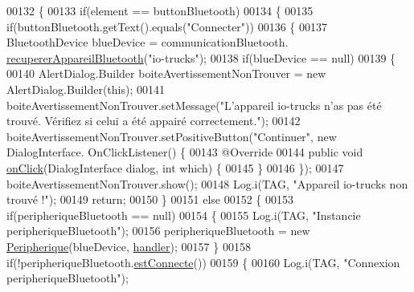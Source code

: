 \begin{DoxyCode}
00132     \{
00133         \textcolor{keywordflow}{if}(element == buttonBluetooth)
00134         \{
00135             \textcolor{keywordflow}{if}(buttonBluetooth.getText().equals(\textcolor{stringliteral}{"Connecter"}))
00136             \{
00137                 BluetoothDevice blueDevice = communicationBluetooth.
      \hyperlink{classcom_1_1lasalle_1_1io__trucks_1_1_communication_a84ae8043b94d6f156a30f6f90dbbba4e}{recupererAppareilBluetooth}(\textcolor{stringliteral}{"io-trucks"});
00138                 \textcolor{keywordflow}{if}(blueDevice == null)
00139                 \{
00140                     AlertDialog.Builder boiteAvertissementNonTrouver = \textcolor{keyword}{new} AlertDialog.Builder(\textcolor{keyword}{this});
00141                     boiteAvertissementNonTrouver.setMessage(\textcolor{stringliteral}{"L'appareil io-trucks n'as pas été trouvé.
       Vérifiez si celui a été appairé correctement."});
00142                     boiteAvertissementNonTrouver.setPositiveButton(\textcolor{stringliteral}{"Continuer"}, \textcolor{keyword}{new} DialogInterface.
      OnClickListener() \{
00143                         @Override
00144                         \textcolor{keyword}{public} \textcolor{keywordtype}{void} \hyperlink{classcom_1_1lasalle_1_1io__trucks_1_1_main_activity_a154e0d879d71bfbe95bc2d566517589d}{onClick}(DialogInterface dialog, \textcolor{keywordtype}{int} which) \{
00145                         \}
00146                     \});
00147                     boiteAvertissementNonTrouver.show();
00148                     Log.i(TAG, \textcolor{stringliteral}{"Appareil io-trucks non trouvé !"});
00149                     \textcolor{keywordflow}{return};
00150                 \}
00151                 \textcolor{keywordflow}{else}
00152                 \{
00153                     \textcolor{keywordflow}{if}(peripheriqueBluetooth == null)
00154                     \{
00155                         Log.i(TAG, \textcolor{stringliteral}{"Instancie peripheriqueBluetooth"});
00156                         peripheriqueBluetooth = \textcolor{keyword}{new} \hyperlink{classcom_1_1lasalle_1_1io__trucks_1_1_peripherique}{Peripherique}(blueDevice, 
      \hyperlink{classcom_1_1lasalle_1_1io__trucks_1_1_main_activity_a16435e06fc13fa3938f40a1bd5e1eb0b}{handler});
00157                     \}
00158                     \textcolor{keywordflow}{if}(!peripheriqueBluetooth.\hyperlink{classcom_1_1lasalle_1_1io__trucks_1_1_peripherique_a53878a13cdb7b3d8fa8e7c97cb0287f0}{estConnecte}())
00159                     \{
00160                         Log.i(TAG, \textcolor{stringliteral}{"Connexion peripheriqueBluetooth"});

\end{DoxyCode}
